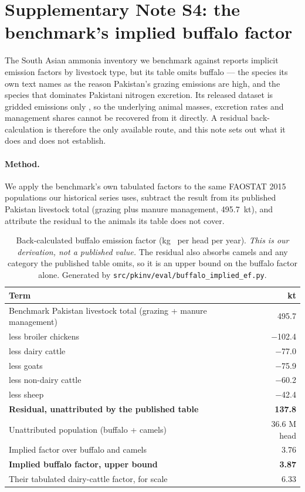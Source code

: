 \section{Supplementary Note S4: the benchmark's implied buffalo factor}
\label{app:buffalo}

The South Asian ammonia inventory we benchmark against \citep{sanh2026} reports implicit emission
factors by livestock type, but its table omits buffalo --- the species its own text names as the
reason Pakistan's grazing emissions are high, and the species that dominates Pakistani nitrogen
excretion. Its released dataset is gridded emissions only \citep{sanh2026data}, so the underlying
animal masses, excretion rates and management shares cannot be recovered from it directly. A residual
back-calculation is therefore the only available route, and this note sets out what it does and does
not establish.

\paragraph{Method.} We apply the benchmark's own tabulated factors to the same FAOSTAT 2015
populations our historical series uses, subtract the result from its published Pakistan livestock
total (grazing plus manure management, \SI{495.7}{}~kt), and attribute the residual to the animals its
table does not cover.

\begin{table}[!htbp]
\centering
\footnotesize
\begin{tabular}{@{}lr@{}}
\toprule
\textbf{Term} & \textbf{kt \NHthree{}} \\
\midrule
Benchmark Pakistan livestock total (grazing + manure management) & 495.7 \\
\quad less broiler chickens & $-$102.4 \\
\quad less dairy cattle & $-$77.0 \\
\quad less goats & $-$75.9 \\
\quad less non-dairy cattle & $-$60.2 \\
\quad less sheep & $-$42.4 \\
\midrule
\textbf{Residual, unattributed by the published table} & \textbf{137.8} \\
Unattributed population (buffalo + camels) & 36.6 M head \\
\midrule
Implied factor over buffalo and camels & 3.76 \\
\textbf{Implied buffalo factor, upper bound} & \textbf{3.87} \\
Their tabulated dairy-cattle factor, for scale & 6.33 \\
\bottomrule
\end{tabular}
\caption{Back-calculated buffalo emission factor (kg~\NHthree{} per head per year). \emph{This is our
derivation, not a published value.} The residual also absorbs camels and any category the published
table omits, so it is an upper bound on the buffalo factor alone. Generated by
\texttt{src/pkinv/eval/buffalo\_implied\_ef.py}.}
\label{tab:buffalo}
\end{table}

